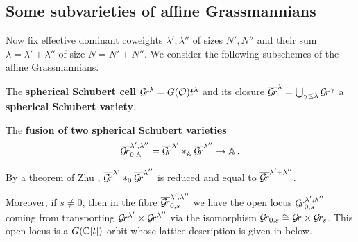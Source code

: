 \documentclass[draft]{article}
\begin{document}
\subsection{Some subvarieties of affine Grassmannians}
\label{ss:subgrs}
Now fix effective dominant coweights $\lambda', \lambda'' $ of sizes $N',N''$  and their sum $ \lambda = \lambda' + \lambda'' $ of size $ N = N'+N''$. 
We consider the following subschemes of the affine Grassmannians.
% 
\begin{definition}
\label{def:sphschub}
    The \textbf{spherical Schubert cell} $\mathcal{G}\!r^\lambda = G(\mathcal O) t^\lambda$ and its closure 
    $ \overline{\mathcal{G}\!r}^\lambda = \bigcup_{\gamma \le \lambda} \mathcal{G}\!r^{\gamma} $ 
    a \textbf{spherical Schubert variety}.  
\end{definition}
\begin{definition}
\label{def:sphfus}
    The \textbf{fusion of two spherical Schubert varieties} 
    $$ 
        \overline{\mathcal{G}\!r}^{\lambda', \lambda''}_{0, \mathbb A} = \overline{\mathcal{G}\!r}^{\lambda'} \ast_\mathbb A \overline{\mathcal{G}\!r}^{\lambda''} \rightarrow \mathbb A \,.
    $$
\end{definition}
By a theorem of Zhu 
\cite[Proposition 3.1.14]{zhu2016introduction}, $ \overline{\mathcal{G}\!r}^{\lambda'} \ast_0 \overline{\mathcal{G}\!r}^{\lambda''} $ is reduced and equal to  $ \overline{\mathcal{G}\!r}^{\lambda' + \lambda''}$.

Moreover, if $s\ne0$, then in the fibre $\overline{\mathcal{G}\!r}_{0,s}^{\lambda', \lambda''}$ we have the open locus $ \mathcal{G}\!r_{0,s}^{\lambda', \lambda''}$ coming from transporting $ \mathcal{G}\!r^{\lambda'} \times \mathcal{G}\!r^{\lambda''} $ via the isomorphism $ \mathcal{G}\!r_{0,s} \cong \mathcal{G}\!r \times \mathcal{G}\!r_s $.  This open locus is a $ G(\mathbb C[t])$-orbit
whose lattice description is given in  below.
\end{document}
